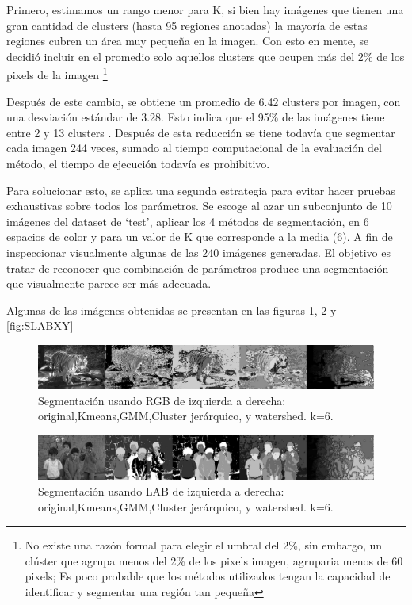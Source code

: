 \documentclass[10pt,twocolumn,letterpaper]{article}
\begin{document}
Primero, estimamos un rango menor para K, si bien hay imágenes que tienen una gran cantidad de clusters (hasta 95 regiones anotadas) la mayoría de estas regiones cubren un área muy pequeña en la imagen. Con esto en mente, se decidió incluir en el promedio solo aquellos clusters que ocupen más del 2\% de los pixels de la imagen \footnote{No existe una razón formal para elegir el umbral del 2\%, sin embargo, un clúster que agrupa menos del 2\% de los pixels imagen, agruparia menos de 60 pixels; Es poco probable que los métodos utilizados tengan la capacidad de identificar y segmentar una región tan pequeña}

Después de este cambio, se obtiene un promedio de 6.42 clusters por imagen, con una desviación estándar de 3.28. Esto indica que el 95\% de las imágenes tiene entre 2 y  13 clusters . Después de esta reducción se tiene todavía que segmentar cada imagen 244 veces, sumado al tiempo computacional de la evaluación del método, el tiempo de ejecución todavía es prohibitivo.

Para solucionar esto, se aplica una segunda estrategia para evitar hacer pruebas exhaustivas sobre todos los parámetros. Se escoge al azar un subconjunto de 10 imágenes del dataset de ‘test’, aplicar los 4 métodos de segmentación, en 6 espacios de color y para un valor de K que corresponde a  la media (6). A fin de inspeccionar visualmente algunas de las 240 imágenes generadas. El objetivo es tratar de reconocer que combinación de parámetros produce una segmentación que visualmente parece ser más adecuada.

Algunas de las imágenes obtenidas se presentan en las figuras \ref{fig:sRGB}, \ref{fig:SLAB} y \ref{fig:SLABXY}


\begin{figure}
\begin{center}
\includegraphics[width=0.95\linewidth]
                {img/RGSample.jpg}
\end{center}
\caption{Segmentación usando RGB de izquierda a derecha: original,Kmeans,GMM,Cluster jerárquico, y watershed. k=6.}
\label{fig:sRGB}
\end{figure}

\begin{figure}
\begin{center}
\includegraphics[width=0.95\linewidth]
                {img/LABSample.jpg}
\end{center}
\caption{Segmentación usando LAB de izquierda a derecha: original,Kmeans,GMM,Cluster jerárquico, y watershed. k=6.}
\label{fig:SLAB}
\end{figure}
\end{document}
